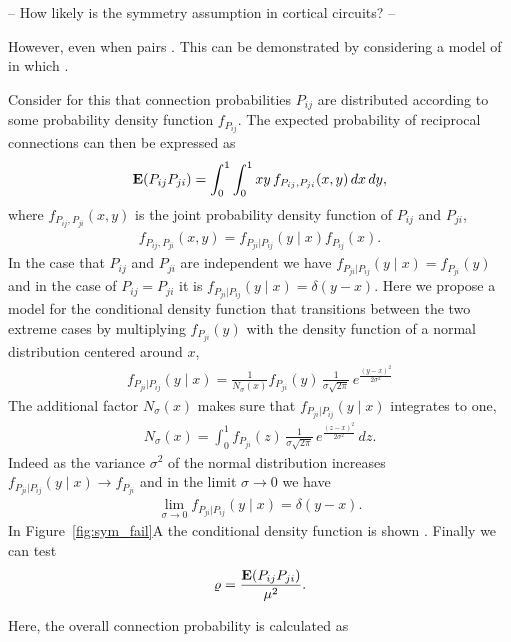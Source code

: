 
-- How likely is the symmetry assumption in cortical circuits? --

However, even when pairs . This can be demonstrated by considering a model of in which .

Consider for this that connection probabilities $P_{ij}$ are distributed according to some probability density function $f_{P_{ij}}$. The expected probability of reciprocal connections can then be expressed as
%
\begin{align}
  \operatorname{\mathbf{E}}(P_{ij}P_{ji}) = \int_0^1 \int_0^1 xy\, f_{P_{ij},P_{ji}}(x,y) \, dx\, dy,
\end{align}
%
where $f_{P_{ij},P_{ji}}(x,y)$ is the joint probability density function of $P_{ij}$ and $P_{ji}$, 
%
\begin{align}
  f_{P_{ij},P_{ji}}(x,y) =  f_{P_{ji} | P_{ij}}(y \mid x) f_{P_{ij}}(x).
\end{align}
%
In the case that $P_{ij}$ and $P_{ji}$ are independent we have $f_{P_{ji} | P_{ij}}(y \mid x) = f_{P_{ji}}(y)$ and in the case of $P_{ij}=P_{ji}$ it is $f_{P_{ji} | P_{ij}}(y \mid x) = \delta(y-x)$.  Here we propose a model for the conditional density function that transitions between the two extreme cases by multiplying $f_{P_{ji}}(y)$ with the density function of a normal distribution centered around $x$,
%
\begin{align}
  f_{P_{ji} | P_{ij}} (y \mid x) = \frac{1}{N_{\sigma}(x)} f_{P_{ji}}(y)\, \frac{1}{\sigma \sqrt{2 \pi}} \,e^{\frac{(y-x)^2}{2 \sigma^2}}
\end{align}
%
The additional factor $N_{\sigma}(x)$  makes sure that $f_{P_{ji}|P_{ij}} (y \mid x)$ integrates to one,
%
\begin{align}
  N_{\sigma}(x) = \int_0^1 f_{P_{ji}}(z)\, \frac{1}{\sigma \sqrt{2 \pi}}\, e^{\frac{(z-x)^2}{2 \sigma^2}} \,dz.
\end{align}
%
Indeed as the variance $\sigma^2$ of the normal distribution increases $f_{P_{ji}|P_{ij}} (y \mid x) \to f_{P_{ji}}$ and in the limit $\sigma \to 0$ we have
\begin{align}
  \lim_{\sigma \to 0}   f_{P_{ji}|P_{ij}} (y \mid x) = \delta(y-x).
\end{align}
%
In Figure~\ref{fig:sym_fail}A the conditional density function is shown . Finally we can test
%
\begin{align}
  \varrho = \frac{\operatorname{\mathbf{E}}(P_{ij} P_{ji})}{\mu^2}.
\end{align}

Here, the overall connection probability is calculated as

